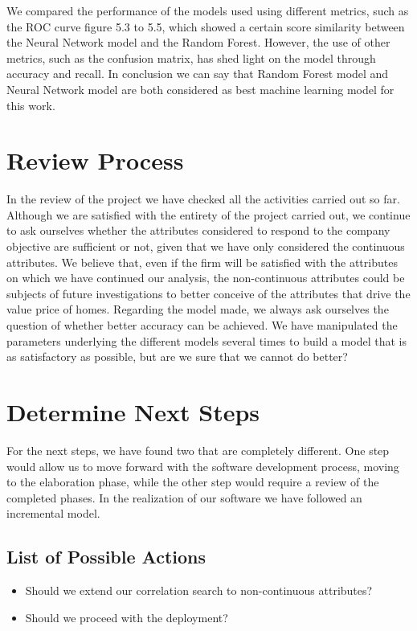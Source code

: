 We compared the performance of the models used using different metrics, such as the ROC curve figure 5.3 to 5.5, which showed a certain score similarity between the Neural Network model and the Random Forest. However, the use of other metrics, such as the confusion matrix, has shed light on the model through accuracy and recall. In conclusion we can say that Random Forest model and Neural Network model are both considered as best machine
learning model for this work. 

\section{Review Process}

In the review of the project we have checked all the activities carried out so far. Although we are satisfied with the entirety of the project carried out, we continue to ask ourselves whether the attributes considered to respond to the company objective are sufficient or not, given that we have only considered the continuous attributes. We believe that, even if the firm will be satisfied with the attributes on which we have continued our analysis, the non-continuous attributes could be subjects of future investigations to better conceive of the attributes that drive the value price of homes. Regarding the model made, we always ask ourselves the question of whether better accuracy can be achieved. We have manipulated the parameters underlying the different models several times to build a model that is as satisfactory as possible, but are we sure that we cannot do better?

\section{Determine Next Steps}

For the next steps, we have found two that are completely different. One step would allow us to move forward with the software development process, moving to the elaboration phase, while the other step would require a review of the completed phases. In the realization of our software we have followed an incremental model.

\subsection{List of Possible Actions}
\begin{itemize}
    \item Should we extend our correlation search to non-continuous attributes?
    \item Should we proceed with the deployment?
\end{itemize}

